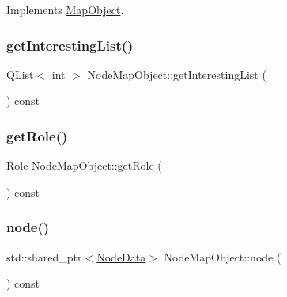 Implements \mbox{\hyperlink{class_map_object_a82e055e41c862ec8d80d5bfb137b3253}{Map\+Object}}.

\mbox{\label{class_node_map_object_a47e5c0ac77d93fd4ff73c6c281414ef7}} 
\subsubsection{\texorpdfstring{getInterestingList()}{getInterestingList()}}
{\footnotesize\ttfamily Q\+List$<$ int $>$ Node\+Map\+Object\+::get\+Interesting\+List (\begin{DoxyParamCaption}{ }\end{DoxyParamCaption}) const\hspace{0.3cm}{\ttfamily [protected]}}

\mbox{\label{class_node_map_object_a5f98b6adabc1b8b2855ea1f7a6185df5}} 
\subsubsection{\texorpdfstring{getRole()}{getRole()}}
{\footnotesize\ttfamily \mbox{\hyperlink{class_node_map_object_a654b2381e7c128e1c9406dd892104a69}{Role}} Node\+Map\+Object\+::get\+Role (\begin{DoxyParamCaption}{ }\end{DoxyParamCaption}) const\hspace{0.3cm}{\ttfamily [inline]}}

\mbox{\label{class_node_map_object_ab13349428a88447dab159b77d1fc20b7}} 
\subsubsection{\texorpdfstring{node()}{node()}}
{\footnotesize\ttfamily std\+::shared\+\_\+ptr$<$\mbox{\hyperlink{class_node_data}{Node\+Data}}$>$ Node\+Map\+Object\+::node (\begin{DoxyParamCaption}{ }\end{DoxyParamCaption}) const\hspace{0.3cm}{\ttfamily [inline]}}

